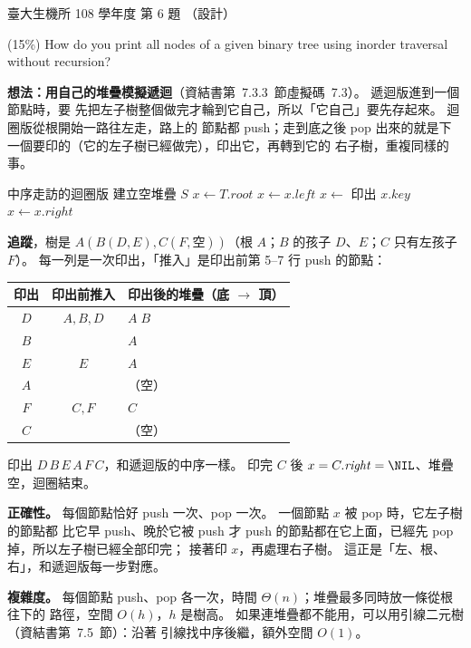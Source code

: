 \begin{pastexam}[label={px:ntu-108-bime-ds-06}]{臺大生機所 108 學年度 第 6 題}
（設計）

(15\%) How do you print all nodes of a given binary tree using inorder traversal without
recursion?
\end{pastexam}

\begin{pastsoln}
\textbf{想法：用自己的堆疊模擬遞迴}（資結書第~7.3.3~節虛擬碼~7.3）。 遞迴版進到一個節點時，要
先把左子樹整個做完才輪到它自己，所以「它自己」要先存起來。 迴圈版從根開始一路往左走，路上的
節點都 push；走到底之後 pop 出來的就是下一個要印的（它的左子樹已經做完），印出它，再轉到它的
右子樹，重複同樣的事。

\begin{pseudo}{中序走訪的迴圈版}
    \State 建立空堆疊 $S$
    \State $x \gets T.\mathit{root}$
         
            \State {}
            \State $x \gets x.\mathit{left}$
        \EndWhile
        \State $x \gets$  
        \State 印出 $x.\mathit{key}$
        \State $x \gets x.\mathit{right}$
    \EndWhile
\EndProcedure
\end{pseudo}

\textbf{追蹤}，樹是 $A(B(D, E), C(F, \text{空}))$（根 $A$；$B$ 的孩子 $D$、$E$；$C$ 只有左孩子
$F$）。 每一列是一次印出，「推入」是印出前第 5--7 行 push 的節點：
\begin{center}
\begin{tabular}{ccl}
\toprule
印出 & 印出前推入 & 印出後的堆疊（底 $\to$ 頂） \\
\midrule
$D$ & $A, B, D$ & $A\;B$ \\
$B$ & & $A$ \\
$E$ & $E$ & $A$ \\
$A$ & & （空） \\
$F$ & $C, F$ & $C$ \\
$C$ & & （空） \\
\bottomrule
\end{tabular}
\end{center}
印出 $D\,B\,E\,A\,F\,C$，和遞迴版的中序一樣。 印完 $C$ 後 $x = C.\mathit{right} = \NIL$、堆疊
空，迴圈結束。

\textbf{正確性。} 每個節點恰好 push 一次、pop 一次。 一個節點 $x$ 被 pop 時，它左子樹的節點都
比它早 push、晚於它被 push 才 push 的節點都在它上面，已經先 pop 掉，所以左子樹已經全部印完；
接著印 $x$，再處理右子樹。 這正是「左、根、右」，和遞迴版每一步對應。

\textbf{複雜度。} 每個節點 push、pop 各一次，時間 $\Theta(n)$；堆疊最多同時放一條從根往下的
路徑，空間 $O(h)$，$h$ 是樹高。 如果連堆疊都不能用，可以用引線二元樹（資結書第~7.5~節）：沿著
引線找中序後繼，額外空間 $O(1)$。
\end{pastsoln}
